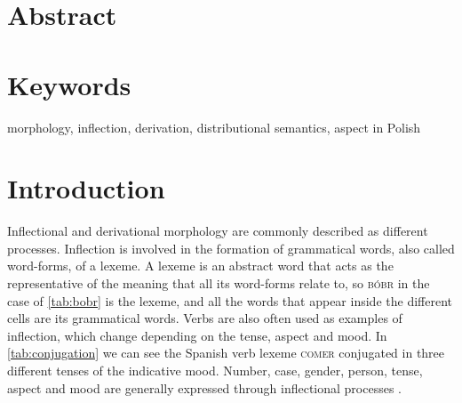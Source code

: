 \documentclass[12pt]{article}
\begin{document}
\section*{Abstract}

\section*{Keywords}
morphology, inflection, derivation, distributional semantics, aspect in Polish

\newpage
\tableofcontents
\newpage


\newpage
\section{Introduction}

Inflectional and derivational morphology are commonly described as different processes. Inflection is involved in the formation of grammatical words, also called word-forms, of a lexeme. A lexeme is an abstract word that acts as the representative of the meaning that all its word-forms relate to, so \textsc{bóbr} in the case of \autoref{tab:bobr} is the lexeme, and all the words that appear inside the different cells are its grammatical words. Verbs are also often used as examples of inflection, which change depending on the tense, aspect and mood. In \autoref{tab:conjugation} we can see the Spanish verb lexeme \textsc{comer} conjugated in three different tenses of the indicative mood. Number, case, gender, person, tense, aspect and mood are generally expressed through inflectional processes \parencite{haspelmath2013UnderstandingMorphology,aronoff2011WhatMorphology}.
\end{document}
